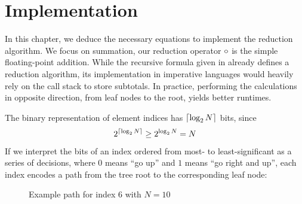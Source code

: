 \chapter{Implementation}
\label{ch:Implementation}

In this chapter, we deduce the necessary equations to implement the reduction algorithm.
We focus on summation, our reduction operator $\operatorname{\circ}$ is the simple floating-point addition.
While the recursive formula given in  already defines a reduction algorithm, its implementation in imperative languages would heavily rely on the call stack to store subtotals.
In practice, performing the calculations in opposite direction, from leaf nodes to the root, yields better runtimes.

The binary representation of element indices has $\lceil \log_2 N \rceil$ bits, since
\begin{equation}
2^{\lceil \log_2 N \rceil} \geq 2^{\log_2 N} = N
\end{equation}
If we interpret the bits of an index ordered from most- to least-significant as a series of decisions, where $0$ means \enquote{go up} and $1$ means \enquote{go right and up}, each index encodes a path from the tree root to the corresponding leaf node:

\begin{figure}[H]
\centering
{}
\caption{Example path for index $6$ with $N = 10$}
\label{fig:indexTreePath}
\end{figure}

